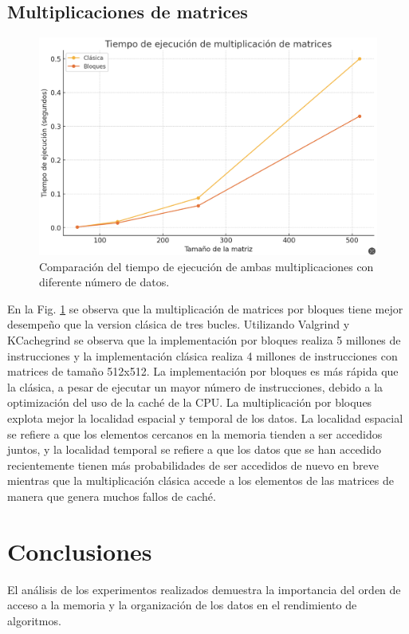 \documentclass[conference]{IEEEtran}
\begin{document}
\subsection{Multiplicaciones de matrices}
\begin{figure}
  \centering
  \includegraphics[width=\columnwidth]{figures/matrices.png}
  \caption{Comparación del tiempo de ejecución de ambas multiplicaciones con diferente número de datos.}
  \label{fig:matrices}
\end{figure}
En la Fig. \ref{fig:matrices} se observa que la multiplicación de matrices por bloques tiene mejor desempeño que la version clásica de tres bucles. Utilizando Valgrind y KCachegrind se observa que la implementación por bloques realiza 5 millones de instrucciones y la implementación clásica realiza 4 millones de instrucciones con matrices de tamaño 512x512. La implementación por bloques es más rápida que la clásica, a pesar de ejecutar un mayor número de instrucciones, debido a la optimización del uso de la caché de la CPU. La multiplicación por bloques explota mejor la localidad espacial y temporal de los datos. La localidad espacial se refiere a que los elementos cercanos en la memoria tienden a ser accedidos juntos, y la localidad temporal se refiere a que los datos que se han accedido recientemente tienen más probabilidades de ser accedidos de nuevo en breve mientras que la multiplicación clásica accede a los elementos de las matrices de manera que genera muchos fallos de caché.\cite{pacheco2011introduction}
\section{Conclusiones}\label{sec:conc}
El análisis de los experimentos realizados demuestra la importancia del orden de acceso a la memoria y la organización de los datos en el rendimiento de algoritmos.
\end{document}
